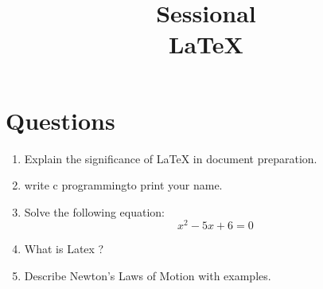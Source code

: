 \documentclass[a4paper,12pt]{article}
\title{Sessional \\ \large LaTeX}
\date{}
\begin{document}
\maketitle


\section*{Questions}

\begin{enumerate}
    \item Explain the significance of LaTeX in document preparation.
    
    \item write c programmingto print your name.
    
    \item Solve the following equation: \[ x^2 - 5x + 6 = 0 \]
    
    \item What is  Latex ?
    
    \item Describe Newton's Laws of Motion with examples.
\end{enumerate}
\end{document}
